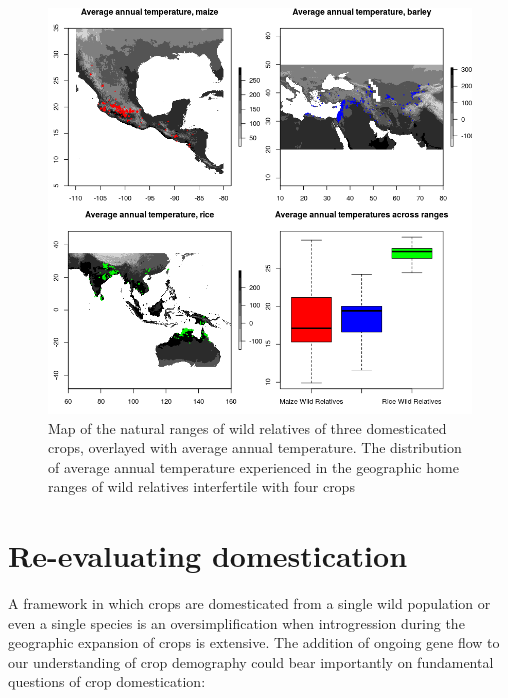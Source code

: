 \documentclass[11pt]{article}
\begin{document}

\begin{figure}[h]
	\centering
	\includegraphics[width=17.35cm]{combination.png}
	\caption{Map of the natural ranges of wild relatives of three domesticated crops, overlayed with average annual temperature. The distribution of average annual temperature experienced in the geographic home ranges of wild relatives interfertile with four crops}
	\label{fig:map}
\end{figure}

\section*{Re-evaluating domestication}

A framework in which crops are domesticated from a single wild population or even a single species is an oversimplification when introgression during the geographic expansion of crops is extensive.
The addition of ongoing gene flow to our understanding of crop demography could bear importantly on fundamental questions of crop domestication:
\end{document}
